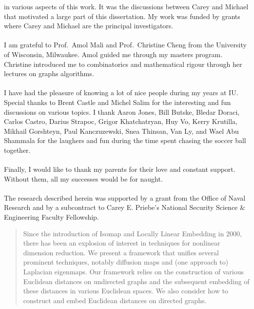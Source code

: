 \documentclass[reqno,final,ugsabstractsigs]{iuthesis}
\theoremstyle{definition}
\numberwithin{equation}{chapter}
\numberwithin{section}{chapter}
\begin{document}
\begin{acknowledgements}
  in various aspects of this work. It was the discussions between Carey
  and Michael that motivated a large part of this dissertation. My
  work was funded by grants where Carey and Michael are the principal investigators. \\
  \\
%
  \noindent I am grateful to Prof.~Amol Mali and Prof.~Christine Cheng
  from the University of Wisconsin, Milwaukee. Amol guided me through
  my masters program. Christine introduced me to combinatorics and
  mathematical rigour through her lectures on graphs algorithms. \\ \\
%
  \noindent I have had the pleasure of knowing a lot of nice people
  during my years at IU\@. Special thanks to Brent Castle and Michel
  Salim for the interesting and fun discussions on various topics. I
  thank Aaron Jones, Bill Butske, Bledar Doraci, Carlos Castro, Darius
  Strapoc, Grigor Khatchatryan, Huy Vo, Kerry Krutilla, Mikhail
  Gorshteyn, Paul Kanczuzewski, Snea Thinsan, Van Ly, and Wael Abu
  Shammala for the laughers and fun during the time spent chasing the
  soccer ball together. \\ \\
%
  \noindent Finally, I would like to thank my parents for their love
  and constant support. Without them, all my successes would be for
  naught. \\ \\
%
  \noindent The research described herein was supported by a grant
  from the Office of Naval Research and by a subcontract to Carey
  E. Priebe's National Security Science \& Engineering Faculty
  Fellowship.
\end{acknowledgements}
\begin{abstract}
  Since the introduction of Isomap
  \cite{tenebaum00:_global_geomet_framew_nonlin_dimen_reduc} and
  Locally Linear Embedding \cite{roweis00:_nonlin} in 2000, there has
  been an explosion of interest in techniques for nonlinear dimension
  reduction.  We present a framework that unifies several prominent
  techniques, notably diffusion maps and (one approach to) Laplacian
  eigenmaps.  Our framework relies on the construction of various
  Euclidean distances on undirected graphs and the subsequent
  embedding of these distances in various Euclidean spaces.  We also
  consider how to construct and embed Euclidean distances on directed
  graphs.
\end{abstract}
\frontmatter
\maketitle
\signaturepage
\makeack
\makeabstract
\tableofcontents
\mainmatter





\appendix



\end{document}
